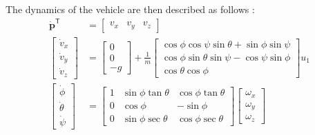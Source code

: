 \documentclass[letterpaper, 10 pt, conference]{ieeeconf}  %
\begin{document}
The dynamics of the vehicle are then described as follows \cite{esencite}:
\begin{equation}
	\begin{aligned}
	\dot{\bm{p}}^{\mathsf{T}} &= \begin{bmatrix}v_x & v_y & v_z\end{bmatrix}\\
	\begin{bmatrix}\dot{v}_x \\ \dot{v}_y \\ \dot{v}_z\end{bmatrix} &= \begin{bmatrix}0 \\ 0 \\ -g \end{bmatrix} + \frac{1}{m} \begin{bmatrix}\cos\phi \cos\psi \sin\theta + \sin\phi \sin\psi \\ \cos\phi \sin\theta \sin\psi - \cos\psi \sin\phi \\ \cos\theta \cos\phi \end{bmatrix} u_1\\
	\begin{bmatrix}\dot{\phi} \\ \dot{\theta} \\ \dot{\psi}\end{bmatrix} &= \begin{bmatrix}1 & \sin\phi \tan\theta & \cos\phi \tan\theta\\ 0 & \cos\phi & -\sin\phi \\ 0 & \sin\phi \sec\theta & \cos\phi \sec\theta \end{bmatrix} \begin{bmatrix}\omega_{x} \\ \omega_{y} \\ \omega_{z} \end{bmatrix}\\

\end{aligned}
\end{equation}
\end{document}
